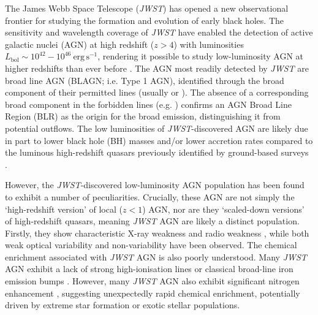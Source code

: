 \documentclass[fleqn,usenatbib]{mnras}
\newcommand{\jwst}{\textit{JWST}\xspace}
\newcommand{\Halpha}{\text{H\textalpha}\xspace}
\newcommand{\Hbeta}{\text{H\textbeta}\xspace}
\newcommand{\HeIIL}{\permittedEL[He][ii]}
\begin{document}
The James Webb Space Telescope (\jwst) has opened a new observational frontier for studying the formation and evolution of early black holes. 
The sensitivity and wavelength coverage of \jwst have enabled the detection of active galactic nuclei (AGN) at high redshift ($z>4$) with luminosities $L_{\mathrm{bol}}\sim 10^{42} - 10^{46} \ \mathrm{erg\,s^{-1}}$, rendering it possible to study low-luminosity AGN at higher redshifts than ever before \citep[e.g.,][]{Kocevski2023, Ubler2023, Harikane2023, Matthee2024, Maiolino2024_JADES, Maiolino2024_Nature, Kokorev2023, Greene2024, Taylor2025, Taylor2025_CAPERS, Juodzbalis2024_Nature, Juodzbalis2026_JADEScensus, Mazzolari2025, Chisholm2024, Scholtz2025, Adamo2025}.
The AGN most readily detected by \jwst are broad line AGN (BLAGN; i.e. Type 1 AGN), identified through the broad component of their permitted lines (usually \Halpha or \Hbeta). The absence of a corresponding broad component in the forbidden lines (e.g. \OIIIL) confirms an AGN Broad Line Region (BLR) as the origin for the broad emission, distinguishing it from potential outflows.
The low luminosities of \jwst-discovered AGN are likely due in part to lower black hole (BH) masses and/or lower accretion rates compared to the luminous high-redshift quasars previously identified by ground-based surveys \citep{Maiolino2024_JADES, Juodzbalis2024_Nature, Juodzbalis2026_JADEScensus}.

However, the \jwst-discovered low-luminosity AGN population has been found to exhibit a number of peculiarities. 
Crucially, these AGN are not simply the `high-redshift version' of local ($z<1$) AGN, nor are they `scaled-down versions' of high-redshift quasars, meaning \jwst AGN are likely a distinct population. 
Firstly, they show characteristic X-ray weakness \citep{Ananna2024, Yue2024_Stack, Maiolino2025_Chandra} and radio weakness \citep{Mazzolari2024, Mazzolari2025}, while both weak optical variability \citep[e.g.][]{Ji2025, Furtak2025, Naidu2025, Zhang2025_LRDvariability, Lin2026_variability} and non-variability \citep[e.g.][]{KokuboHarikane2025, Zhang2025} have been observed. 
The chemical enrichment associated with \jwst AGN is also poorly understood. Many \jwst AGN exhibit a lack of strong high-ionisation lines \citep[e.g.][]{Lambrides2024, Zucchi2026} or classical broad-line iron emission bumps \citep[e.g.][]{Trefoloni2025}. However, many \jwst AGN also exhibit significant nitrogen enhancement \citep{Ji2024, Isobe2025}, suggesting unexpectedly rapid chemical enrichment, potentially driven by extreme star formation or exotic stellar populations.
\end{document}
